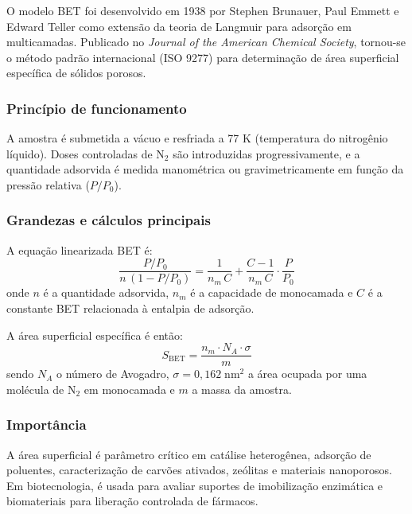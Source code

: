 O modelo BET foi desenvolvido em 1938 por Stephen Brunauer, Paul Emmett
e Edward Teller como extensão da teoria de Langmuir para adsorção em
multicamadas. Publicado no \textit{Journal of the American Chemical Society},
tornou-se o método padrão internacional (ISO 9277) para determinação de
área superficial específica de sólidos porosos.

\subsubsection*{Princípio de funcionamento}

A amostra é submetida a vácuo e resfriada a 77 K (temperatura do
nitrogênio líquido). Doses controladas de $\text{N}_2$ são introduzidas
progressivamente, e a quantidade adsorvida é medida manométrica ou
gravimetricamente em função da pressão relativa ($P/P_0$).

\subsubsection*{Grandezas e cálculos principais}

A equação linearizada BET é:
\begin{equation}
    \frac{P/P_0}{n\,(1 - P/P_0)}
    = \frac{1}{n_m\,C} + \frac{C-1}{n_m\,C}\cdot\frac{P}{P_0}
\end{equation}
onde $n$ é a quantidade adsorvida, $n_m$ é a capacidade de monocamada e
$C$ é a constante BET relacionada à entalpia de adsorção.

A área superficial específica é então:
\begin{equation}
    S_{\text{BET}} = \frac{n_m \cdot N_A \cdot \sigma}{m}
\end{equation}
sendo $N_A$ o número de Avogadro, $\sigma = 0{,}162\;\text{nm}^2$ a área
ocupada por uma molécula de $\text{N}_2$ em monocamada e $m$ a massa da
amostra.

\subsubsection*{Importância}

A área superficial é parâmetro crítico em catálise heterogênea, adsorção
de poluentes, caracterização de carvões ativados, zeólitas e materiais
nanoporosos. Em biotecnologia, é usada para avaliar suportes de
imobilização enzimática e biomateriais para liberação controlada de
fármacos.

